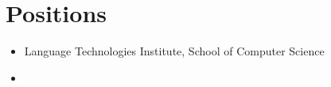 




\section{Positions}
\begin{itemize}[leftmargin=-0.4mm,partopsep=0pt,label=]
  \item {}
    Language Technologies Institute, School of Computer Science

  \item {}
    \vspace{-1.5em}

\end{itemize}

